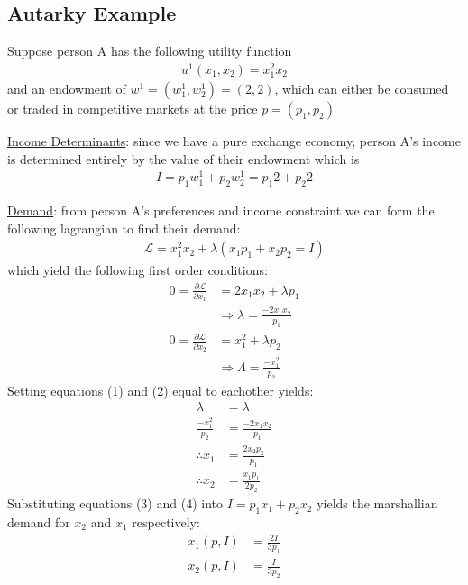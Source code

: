 \documentclass{article}
\begin{document}
\subsection{Autarky Example}
Suppose person A has the following utility function
\begin{gather*}
  u^{1}(x_{1},x_{2}) = x_{1}^{2}x_{2}
\end{gather*}
and an endowment of $w^{1} = (w^{1}_{1}, w^{1}_{2}) = (2,2)$, which can either be consumed or traded in competitive markets at the price $p = (p_{1}, p_{2})$
\par \vspace{0.3em}
  \underline{Income Determinants}: since we have a pure exchange economy, person A's income is determined entirely by the value of their endowment which is
  \begin{gather*}
    I = p_{1}w_{1}^{1} + p_{2}w_{2}^{1} = p_{1}2 + p_{2}2
  \end{gather*}
  \par
  \underline{Demand}: from person A's preferences and income constraint we can form the following lagrangian to find their demand:
  \begin{gather*}
    \mathcal{L} = x_{1}^{2}x_{2} + \lambda(x_{1}p_{1} + x_{2}p_{2} = I)
  \end{gather*}
  which yield the following first order conditions:
  \begin{align*}
    0 = \frac{\partial \mathcal{L}}{\partial x_{1}} &= 2x_{1}x_{2} + \lambda p_{1} \\
    &\Rightarrow \lambda = \frac{-2x_{1}x_{2}}{p_{1}} \ \tag{1} \\
    0 = \frac{\partial \mathcal{L}}{\partial x_{2}} &= x_{1}^{2} + \lambda p_{2} \\
    &\Rightarrow \Lambda  = \frac{-x_{1}^{2}}{p_{2}} \ \tag{2}
  \end{align*}
  Setting equations (1) and (2) equal to eachother yields:
  \begin{align*}
    \lambda &= \lambda \\
    \frac{-x_{1}^{2}}{p_{2}} &= \frac{-2x_{1}x_{2}}{p_{1}} \\
    \therefore x_{1} &= \frac{2x_{2}p_{2}}{p_{1}} \ \tag{3} \\
    \therefore x_{2} &= \frac{x_{1}p_{1}}{2p_{2}} \ \tag{4}
  \end{align*}
  Substituting equations (3) and (4) into $I = p_{1}x_{1} + p_{2}x_{2}$ yields the marshallian demand for $x_{2}$ and $x_{1}$ respectively:
  \begin{align*}
    x_{1}(p,I) &= \frac{2I}{3p_{1}} \\
    x_{2}(p,I) &= \frac{I}{3p_{2}}
  \end{align*}
\end{document}
